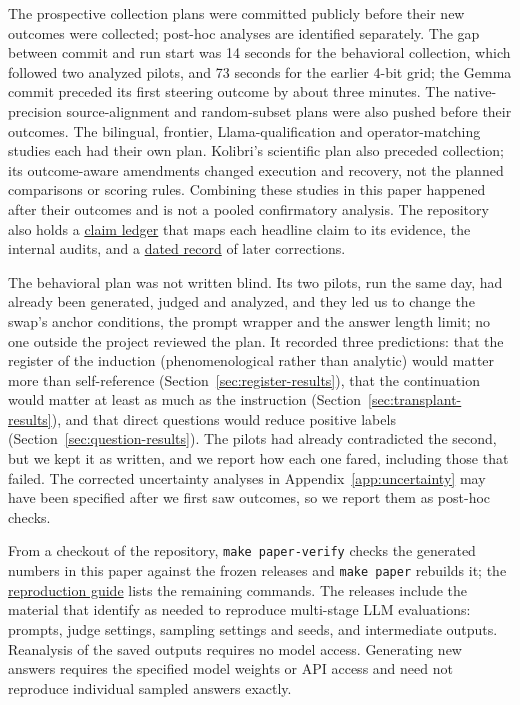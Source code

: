 \documentclass[11pt]{article}
\newcommand{\reviewartifact}[2]{\href{https://github.com/tdj28/llm_selfref_pre/blob/47ca3eda21c8df67dd4fc09bcf4ccac10c2fd4eb/#1}{#2}}
\newcommand{\mainartifact}[2]{\href{https://github.com/tdj28/llm_selfref_pre/blob/99078186076d1c2bd0e3f0ac909f96d78d7cda03/#1}{#2}}
\newcommand{\closeoutartifact}[2]{\href{https://github.com/tdj28/llm_selfref_pre/blob/294da265ee3a08b9ef42343f9461b8d4718b7bc7/#1}{#2}}
\begin{document}
The prospective collection plans were committed publicly before their new
outcomes were collected; post-hoc analyses are identified separately. The gap
between commit and run start was 14 seconds for the behavioral collection,
which followed two analyzed pilots, and 73 seconds for the earlier 4-bit
grid; the Gemma commit preceded its first steering outcome by about three
minutes. The native-precision
source-alignment and random-subset plans were also pushed before their
outcomes. The bilingual, frontier, Llama-qualification and operator-matching
studies each had their own plan. Kolibri's scientific plan also preceded
collection; its outcome-aware amendments changed execution and recovery,
not the planned comparisons or scoring rules. Combining these studies in this paper happened after
their outcomes and is not a pooled confirmatory analysis. The repository also
holds a \reviewartifact{docs/CLAIM_LEDGER.md}{claim ledger} that maps each
headline claim to its evidence, the internal audits, and a
\mainartifact{docs/ANALYSIS_CHRONOLOGY.md}{dated record} of later
corrections.

The behavioral plan was not written blind. Its two pilots, run the same day,
had already been generated, judged and analyzed, and they led us to change
the swap's anchor conditions, the prompt wrapper and the answer length limit;
no one outside the project reviewed the plan. It recorded three predictions:
that the register of the induction (phenomenological rather than analytic)
would matter more than self-reference (Section~\ref{sec:register-results}),
that the continuation would matter at least as much as the instruction
(Section~\ref{sec:transplant-results}), and that direct questions would
reduce positive labels (Section~\ref{sec:question-results}). The pilots had
already contradicted the second, but we kept it as written, and we report
how each one fared, including those that failed. The corrected uncertainty
analyses in Appendix~\ref{app:uncertainty} may have been specified after we
first saw outcomes, so we report them as post-hoc checks.

From a checkout of the repository, \texttt{make paper-verify} checks the
generated numbers in this paper against the frozen releases and
\texttt{make paper} rebuilds it; the
\closeoutartifact{docs/REPRODUCTION.md}{reproduction guide} lists the
remaining commands. The releases include the material that
\citet{pattnayak2026reproevalcard} identify as needed to reproduce multi-stage
LLM evaluations: prompts, judge settings, sampling settings and seeds, and
intermediate outputs. Reanalysis of the saved outputs requires no model
access. Generating new answers requires the specified model weights or
API access and need not reproduce individual sampled answers exactly.
\end{document}
